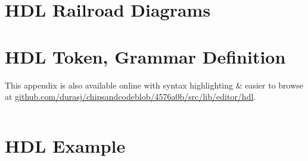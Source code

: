 \appendix

\chapter{HDL Railroad Diagrams}
\label{appendix:hdl-railroad}

\noindent


\vspace{20pt}

\noindent


\noindent


\vspace{20pt}

\noindent


\vspace{20pt}

\noindent


\vspace{20pt}

\noindent


\noindent


\vspace{20pt}

\noindent


\vspace{20pt}

\noindent


\vspace{20pt}

\noindent


\chapter{HDL Token, Grammar Definition}
\label{appendix:hdl-grammar}

This appendix is also available online with syntax highlighting \& easier to browse at \href{https://github.com/durasj/chipsandcode/blob/4576a0b/src/lib/editor/hdl/grammar.ne}{github.com/durasj/chipsandcodeblob/4576a0b/src/lib/editor/hdl}.

\inputminted[breaklines=true,fontsize=\footnotesize]{text}{./assets/hdl.ne}

\chapter{HDL Example}
\label{appendix:hdl-example}

